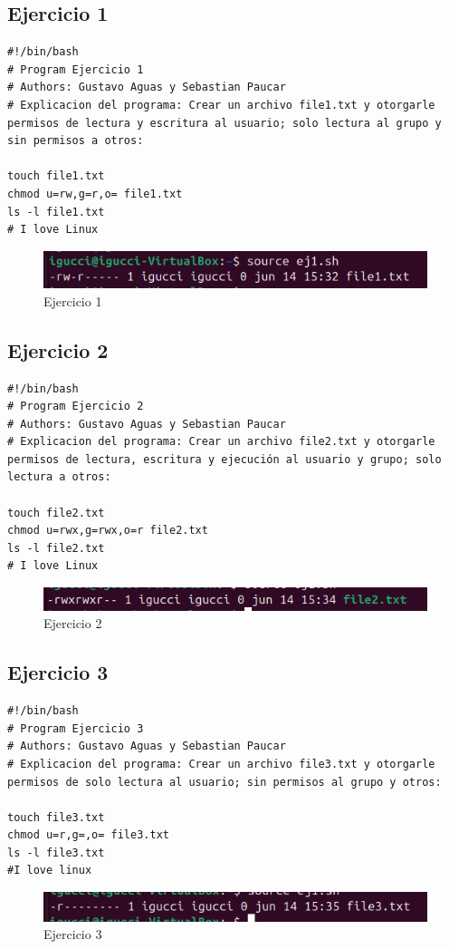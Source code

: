 \documentclass[11pt,twoside]{book}
\begin{document}
\subsection{Ejercicio 1}
\begin{lstlisting}
#!/bin/bash
# Program Ejercicio 1
# Authors: Gustavo Aguas y Sebastian Paucar
# Explicacion del programa: Crear un archivo file1.txt y otorgarle permisos de lectura y escritura al usuario; solo lectura al grupo y sin permisos a otros:

touch file1.txt
chmod u=rw,g=r,o= file1.txt
ls -l file1.txt
# I love Linux
\end{lstlisting}
\begin{figure}
    \centering
    \includegraphics[width=1\linewidth]{psimb/ej1.png}
    \caption{Ejercicio 1}
\end{figure}

\newpage
\subsection{Ejercicio 2}
\begin{lstlisting}
#!/bin/bash
# Program Ejercicio 2
# Authors: Gustavo Aguas y Sebastian Paucar
# Explicacion del programa: Crear un archivo file2.txt y otorgarle permisos de lectura, escritura y ejecución al usuario y grupo; solo lectura a otros:

touch file2.txt
chmod u=rwx,g=rwx,o=r file2.txt
ls -l file2.txt
# I love Linux
\end{lstlisting}
\begin{figure}
    \centering
    \includegraphics[width=1\linewidth]{psimb/ej2.png}
    \caption{Ejercicio 2}
\end{figure}
\newpage
\subsection{Ejercicio 3}
\begin{lstlisting}
#!/bin/bash
# Program Ejercicio 3
# Authors: Gustavo Aguas y Sebastian Paucar
# Explicacion del programa: Crear un archivo file3.txt y otorgarle permisos de solo lectura al usuario; sin permisos al grupo y otros:

touch file3.txt
chmod u=r,g=,o= file3.txt
ls -l file3.txt
#I love linux
\end{lstlisting}
\begin{figure}
    \centering
    \includegraphics[width=1\linewidth]{psimb/ej3.png}
    \caption{Ejercicio 3}
\end{figure}
\newpage
\end{document}
